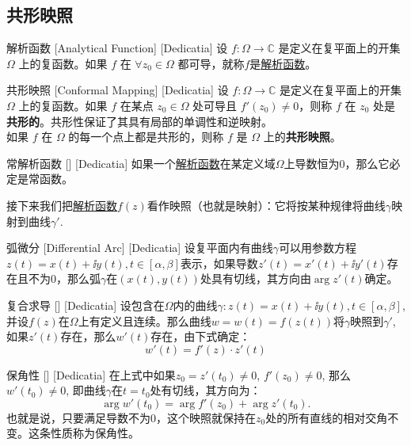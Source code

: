 \documentclass[UTF8]{ctexart}
\newcommand{\AnalyticalFunction}{\hyperref[dfn:AnalyticalFunction]{解析函数}}
\begin{document}
\subsection{共形映照}
\begin{dfn}
    [UUID]
    {解析函数}
    [Analytical Function]
    [Dedicatia]
    设 \( f: \Omega \to \mathbb{C} \) 是定义在复平面上的开集 \( \Omega \) 上的复函数。如果 \( f \) 在 \(\forall z_0 \in \Omega \) 都可导，就称$f$是\AnalyticalFunction 。
\end{dfn}
\begin{dfn}
    [ConformalMapping]
    {共形映照}
    [Conformal Mapping]
    [Dedicatia]
    设 \( f: \Omega \to \mathbb{C} \) 是定义在复平面上的开集 \( \Omega \) 上的复函数。如果 \( f \) 在某点 \( z_0 \in \Omega \) 处可导且 \( f'(z_0) \neq 0 \)，则称 \( f \) 在 \( z_0 \) 处是\textbf{共形的}。共形性保证了其具有局部的单调性和逆映射。\\
    如果 \( f \) 在 \( \Omega \) 的每一个点上都是共形的，则称 \( f \) 是 \( \Omega \) 上的\textbf{共形映照}。
\end{dfn}
\begin{ppt}
    [TrivialAnalyticalFunction]
    {常解析函数}
    []
    [Dedicatia]
    如果一个\AnalyticalFunction 在某定义域$\Omega$上导数恒为0，那么它必定是常函数。
\end{ppt}
接下来我们把\AnalyticalFunction $f(z)$看作映照（也就是映射）：它将按某种规律将曲线$\gamma$映射到曲线$\gamma'$. 
\begin{dfn}
    [UUID]
    {弧微分}
    [Differential Arc]
    [Dedicatia]
    设复平面内有曲线$\gamma$可以用参数方程$z(t)=x(t)+\ii y(t), t\in[\alpha,\beta]$表示，如果导数$z'(t)=x'(t)+\ii y'(t)$存在且不为0，那么弧$\gamma$在$(x(t),y(t))$处具有切线，其方向由$\arg z'(t)$确定。
\end{dfn}
\begin{thm}
    [UUID]
    {复合求导}
    []
    [Dedicatia]
    设包含在$\Omega$内的曲线$\gamma:z(t)=x(t)+\ii y(t), t\in[\alpha,\beta]$, 并设$f(z)$在$\Omega$上有定义且连续。那么曲线$w=w(t)=f(z(t))$将$\gamma$映照到$\gamma'$, 如果$z'(t)$存在，那么$w'(t)$存在，由下式确定：
    \[w'(t)=f'(z)\cdot z'(t)\]
\end{thm}
\begin{thm}
    [UUID]
    {保角性}
    []
    [Dedicatia]
    在上式中如果$z_0=z'(t_0)\neq 0$, $f'(z_0)\neq 0$, 那么$w'(t_0)\neq 0$, 即曲线$\gamma$在$t=t_0$处有切线，其方向为：
    \[\arg w'(t_0)=\arg f'(z_0)+\arg z'(t_0).\]
    也就是说，只要满足导数不为0，这个映照就保持在$z_0$处的所有直线的相对交角不变。这条性质称为保角性。
\end{thm}
\end{document}
